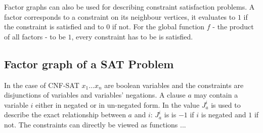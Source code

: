 \newpage
Factor graphs can also be used for describing constraint satisfaction problems. A factor corresponds to a constraint on its neighbour vertices, it evaluates to $1$ if the constraint is satisfied and to $0$ if not. For the global function $f$ - the product of all factors - to be $1$, every constraint has to be is satisfied.  \newline



\subsection{Factor graph of a SAT Problem}
In the case of CNF-SAT $x_1 \ldots x_n$ are boolean variables and the constraints are disjunctions of variables and variables' negations. \newline A clause $a$ may contain a variable $i$ either in negated or in un-negated form. In \cite{Zitat} the value  $J_a^i$ is used to describe the exact relationship between $a$ and $i$: $J_a^i$ is   is $-1$ if $i$ is negated and $1$ if not. 
The constraints can directly be viewed as functions ...


